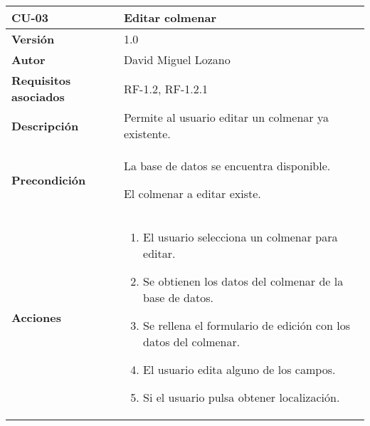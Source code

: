 \begin{longtable}[H]{@{}ll@{}}
\toprule
\begin{minipage}[b]{0.26\columnwidth}\raggedright\strut
\textbf{CU-03}\strut
\end{minipage} & \begin{minipage}[b]{0.68\columnwidth}\raggedright\strut
\textbf{Editar colmenar}\strut
\end{minipage}\tabularnewline
\midrule
\endhead
\begin{minipage}[t]{0.26\columnwidth}\raggedright\strut
\textbf{Versión}\strut
\end{minipage} & \begin{minipage}[t]{0.68\columnwidth}\raggedright\strut
1.0\strut
\end{minipage}\tabularnewline
\begin{minipage}[t]{0.26\columnwidth}\raggedright\strut
\textbf{Autor}\strut
\end{minipage} & \begin{minipage}[t]{0.68\columnwidth}\raggedright\strut
David Miguel Lozano\strut
\end{minipage}\tabularnewline
\begin{minipage}[t]{0.26\columnwidth}\raggedright\strut
\textbf{Requisitos asociados}\strut
\end{minipage} & \begin{minipage}[t]{0.68\columnwidth}\raggedright\strut
RF-1.2, RF-1.2.1\strut
\end{minipage}\tabularnewline
\begin{minipage}[t]{0.26\columnwidth}\raggedright\strut
\textbf{Descripción}\strut
\end{minipage} & \begin{minipage}[t]{0.68\columnwidth}\raggedright\strut
Permite al usuario editar un colmenar ya existente.\strut
\end{minipage}\tabularnewline
\begin{minipage}[t]{0.26\columnwidth}\raggedright\strut
\textbf{Precondición}\strut
\end{minipage} & \begin{minipage}[t]{0.68\columnwidth}\raggedright\strut
La base de datos se encuentra disponible.

El colmenar a editar existe.\strut
\end{minipage}\tabularnewline
\begin{minipage}[t]{0.26\columnwidth}\raggedright\strut
\textbf{Acciones}\strut
\end{minipage} & \begin{minipage}[t]{0.68\columnwidth}\raggedright\strut
\begin{enumerate}
\def\labelenumi{\arabic{enumi}.}
\tightlist
\item
  El usuario selecciona un colmenar para editar.
\item
  Se obtienen los datos del colmenar de la base de datos.
\item
  Se rellena el formulario de edición con los datos del colmenar.
\item
  El usuario edita alguno de los campos.
\item
  Si el usuario pulsa obtener localización.


\end{enumerate}
\end{minipage}
\end{longtable}

